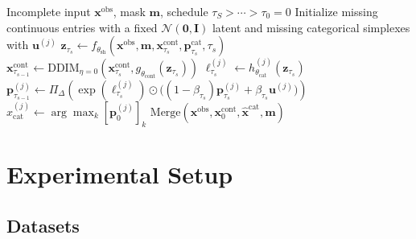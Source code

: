 \documentclass[times, review, 10pt]{elsarticle}
\newcommand{\DIFaddbegin}{\begingroup\color{blue}}
\newcommand{\DIFaddend}{\endgroup}
\newcommand{\algsmall}{\footnotesize}
\begin{document}
\begin{algorithm}[t]
\caption{MissHDD deterministic inference}
\label{alg:inference}
\algsmall
\begin{algorithmic}[1]
\Require Incomplete input $\mathbf{x}^{\mathrm{obs}}$, mask $\mathbf{m}$, schedule $\tau_S>\cdots>\tau_0=0$
\State Initialize missing continuous entries with a fixed $\mathcal{N}(\mathbf{0},\mathbf{I})$ latent and missing categorical simplexes with $\mathbf{u}^{(j)}$
    \State $\mathbf{z}_{\tau_s}\gets f_{\theta_{\mathrm{sh}}}(\mathbf{x}^{\mathrm{obs}},\mathbf{m},
    \mathbf{x}^{\mathrm{cont}}_{\tau_s},\mathbf{p}^{\mathrm{cat}}_{\tau_s},\tau_s)$
    \State $\mathbf{x}^{\mathrm{cont}}_{\tau_{s-1}}\gets
    \mathrm{DDIM}_{\eta=0}(\mathbf{x}^{\mathrm{cont}}_{\tau_s},g_{\theta_{\mathrm{cont}}}(\mathbf{z}_{\tau_s}))$
        \State $\boldsymbol{\ell}^{(j)}_{\tau_s}\gets h_{\theta_{\mathrm{cat}}}^{(j)}(\mathbf{z}_{\tau_s})$
        \State $\mathbf{p}^{(j)}_{\tau_{s-1}}\gets
        \Pi_\Delta\!\left(\exp(\boldsymbol{\ell}^{(j)}_{\tau_s})
        \odot\big((1-\beta_{\tau_s})\mathbf{p}^{(j)}_{\tau_s}+\beta_{\tau_s}\mathbf{u}^{(j)}\big)\right)$
    \EndFor
\EndFor
\State $\hat{x}^{(j)}_{\mathrm{cat}}\gets \arg\max_k[\mathbf{p}^{(j)}_{0}]_k$
\State \Return $\mathrm{Merge}(\mathbf{x}^{\mathrm{obs}},\mathbf{x}^{\mathrm{cont}}_0,\hat{\mathbf{x}}^{\mathrm{cat}},\mathbf{m})$
\end{algorithmic}
\end{algorithm}

\DIFaddend


\section{Experimental Setup}

\DIFaddbegin
\DIFaddend


\subsection{Datasets}
\end{document}
